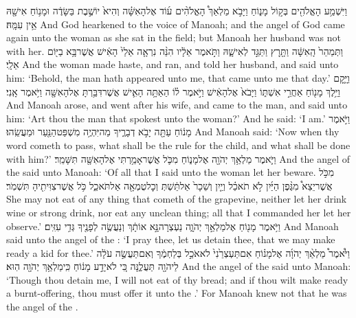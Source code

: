 {וַיִּשְׁמַ֥ע הָאֱלֹהִ֖ים בְּק֣וֹל מָנ֑וֹחַ וַיָּבֹ֣א מַלְאַךְ֩ הָאֱלֹהִ֨ים ע֜וֹד אֶל\maqqaf הָאִשָּׁ֗ה וְהִיא֙ יוֹשֶׁ֣בֶת בַּשָּׂדֶ֔ה וּמָנ֥וֹחַ אִישָׁ֖הּ אֵ֥ין עִמָּֽהּ׃}
{And God hearkened to the voice of Manoah; and the angel of God came again unto the woman as she sat in the field; but Manoah her husband was not with her.}
{וַתְּמַהֵר֙ הָֽאִשָּׁ֔ה וַתָּ֖רׇץ וַתַּגֵּ֣ד לְאִישָׁ֑הּ וַתֹּ֣אמֶר אֵלָ֔יו הִנֵּ֨ה נִרְאָ֤ה אֵלַי֙ הָאִ֔ישׁ אֲשֶׁר\maqqaf בָּ֥א בַיּ֖וֹם אֵלָֽי׃}
{And the woman made haste, and ran, and told her husband, and said unto him: ‘Behold, the man hath appeared unto me, that came unto me that day.’}
{וַיָּ֛קׇם וַיֵּ֥לֶךְ מָנ֖וֹחַ אַחֲרֵ֣י אִשְׁתּ֑וֹ וַיָּבֹא֙ אֶל\maqqaf הָאִ֔ישׁ וַיֹּ֣אמֶר ל֗וֹ הַאַתָּ֥ה הָאִ֛ישׁ אֲשֶׁר\maqqaf דִּבַּ֥רְתָּ אֶל\maqqaf הָאִשָּׁ֖ה וַיֹּ֥אמֶר אָֽנִי׃}
{And Manoah arose, and went after his wife, and came to the man, and said unto him: ‘Art thou the man that spokest unto the woman?’ And he said: ‘I am.’}
{וַיֹּ֣אמֶר מָנ֔וֹחַ עַתָּ֖ה יָבֹ֣א דְבָרֶ֑יךָ מַה\maqqaf יִּהְיֶ֥ה מִשְׁפַּט\maqqaf הַנַּ֖עַר וּמַעֲשֵֽׂהוּ׃}
{And Manoah said: ‘Now when thy word cometh to pass, what shall be the rule for the child, and what shall be done with him?’}
{וַיֹּ֛אמֶר מַלְאַ֥ךְ יְהֹוָ֖ה אֶל\maqqaf מָנ֑וֹחַ מִכֹּ֛ל אֲשֶׁר\maqqaf אָמַ֥רְתִּי אֶל\maqqaf הָאִשָּׁ֖ה תִּשָּׁמֵֽר׃}
{And the angel of the \lord\space said unto Manoah: ‘Of all that I said unto the woman let her beware.}
{מִכֹּ֣ל אֲשֶׁר\maqqaf יֵצֵא֩ מִגֶּ֨פֶן הַיַּ֜יִן לֹ֣א תֹאכַ֗ל וְיַ֤יִן וְשֵׁכָר֙ אַל\maqqaf תֵּ֔שְׁתְּ וְכׇל\maqqaf טֻמְאָ֖ה אַל\maqqaf תֹּאכַ֑ל כֹּ֥ל אֲשֶׁר\maqqaf צִוִּיתִ֖יהָ תִּשְׁמֹֽר׃ \setuma }
{She may not eat of any thing that cometh of the grapevine, neither let her drink wine or strong drink, nor eat any unclean thing; all that I commanded her let her observe.’}
{וַיֹּ֥אמֶר מָנ֖וֹחַ אֶל\maqqaf מַלְאַ֣ךְ יְהֹוָ֑ה נַעְצְרָה\maqqaf נָּ֣א אוֹתָ֔ךְ וְנַעֲשֶׂ֥ה לְפָנֶ֖יךָ גְּדִ֥י עִזִּֽים׃}
{And Manoah said unto the angel of the \lord: ‘I pray thee, let us detain thee, that we may make ready a kid for thee.’}
{וַיֹּ֩אמֶר֩ מַלְאַ֨ךְ יְהֹוָ֜ה אֶל\maqqaf מָנ֗וֹחַ אִם\maqqaf תַּעְצְרֵ֙נִי֙ לֹא\maqqaf אֹכַ֣ל בְּלַחְמֶ֔ךָ וְאִם\maqqaf תַּעֲשֶׂ֣ה עֹלָ֔ה לַיהֹוָ֖ה תַּעֲלֶ֑נָּה כִּ֚י לֹא\maqqaf יָדַ֣ע מָנ֔וֹחַ כִּֽי\maqqaf מַלְאַ֥ךְ יְהֹוָ֖ה הֽוּא׃}
{And the angel of the \lord\space said unto Manoah: ‘Though thou detain me, I will not eat of thy bread; and if thou wilt make ready a burnt-offering, thou must offer it unto the \lord.’ For Manoah knew not that he was the angel of the \lord.}
